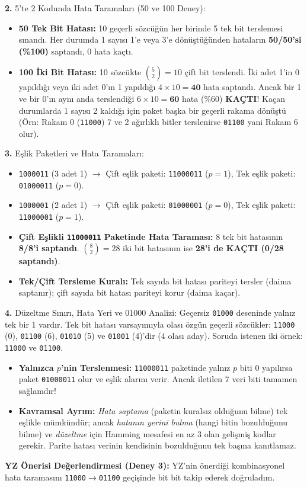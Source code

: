 \documentclass[10pt,a4paper]{article}
\begin{document}
\textbf{2.} 5'te 2 Kodunda Hata Taramaları (50 ve 100 Deney):
\begin{itemize}
    \item \textbf{50 Tek Bit Hatası:} 10 geçerli sözcüğün her birinde 5 tek bit terslemesi sınandı. Her durumda 1 sayısı 1'e veya 3'e dönüştüğünden hataların \textbf{50/50'si (\%100)} saptandı, 0 hata kaçtı.
    \item \textbf{100 İki Bit Hatası:} 10 sözcükte $\binom{5}{2}=10$ çift bit terslendi. İki adet 1'in 0 yapıldığı veya iki adet 0'ın 1 yapıldığı $4 \times 10 = \mathbf{40}$ hata saptandı. Ancak bir 1 ve bir 0'ın aynı anda terslendiği $6 \times 10 = \mathbf{60}$ hata (\%60) \textbf{KAÇTI}! Kaçan durumlarda 1 sayısı 2 kaldığı için paket başka bir geçerli rakama dönüştü (Örn: Rakam 0 (\texttt{11000}) 7 ve 2 ağırlıklı bitler terslenirse \texttt{01100} yani Rakam 6 olur).
\end{itemize}

\textbf{3.} Eşlik Paketleri ve Hata Taramaları:
\begin{itemize}
    \item \texttt{1000011} (3 adet 1) $\rightarrow$ Çift eşlik paketi: \texttt{11000011} ($p=1$), Tek eşlik paketi: \texttt{01000011} ($p=0$).
    \item \texttt{1000001} (2 adet 1) $\rightarrow$ Çift eşlik paketi: \texttt{01000001} ($p=0$), Tek eşlik paketi: \texttt{11000001} ($p=1$).
    \item \textbf{Çift Eşlikli \texttt{11000011} Paketinde Hata Taraması:} 8 tek bit hatasının \textbf{8/8'i saptandı}. $\binom{8}{2}=28$ iki bit hatasının ise \textbf{28'i de KAÇTI (0/28 saptandı)}.
    \item \textbf{Tek/Çift Tersleme Kuralı:} Tek sayıda bit hatası pariteyi tersler (daima saptanır); çift sayıda bit hatası pariteyi korur (daima kaçar).
\end{itemize}

\textbf{4.} Düzeltme Sınırı, Hata Yeri ve 01000 Analizi:
Geçersiz \texttt{01000} deseninde yalnız tek bir 1 vardır. Tek bit hatası varsayımıyla olası özgün geçerli sözcükler: \texttt{11000} (0), \texttt{01100} (6), \texttt{01010} (5) ve \texttt{01001} (4)'dir (4 olası aday). Soruda istenen iki örnek: \texttt{11000} ve \texttt{01100}.
\begin{itemize}
    \item \textbf{Yalnızca $p$'nin Terslenmesi:} \texttt{11000011} paketinde yalnız $p$ biti 0 yapılırsa paket \texttt{01000011} olur ve eşlik alarmı verir. Ancak iletilen 7 veri biti tamamen sağlamdır!
    \item \textbf{Kavramsal Ayrım:} \textit{Hata saptama} (paketin kuralsız olduğunu bilme) tek eşlikle mümkündür; ancak \textit{hatanın yerini bulma} (hangi bitin bozulduğunu bilme) ve \textit{düzeltme} için Hamming mesafesi en az 3 olan gelişmiş kodlar gerekir. Parite hatası verinin kendisinin bozulduğunu tek başına kanıtlamaz.
\end{itemize}
\textbf{YZ Önerisi Değerlendirmesi (Deney 3):} YZ'nin önerdiği kombinasyonel hata taramasını \texttt{11000}$\rightarrow$\texttt{01100} geçişinde bit bit takip ederek doğruladım.
\end{document}
